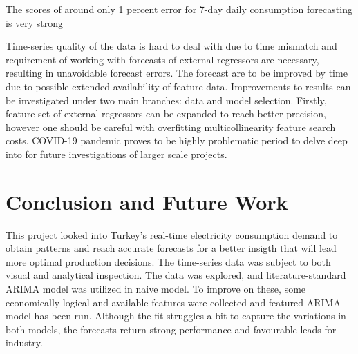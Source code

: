 \documentclass[11pt, a4paper, leqno]{article}
\begin{document}
The scores of around only 1 percent error for 7-day daily consumption forecasting is very strong

Time-series quality of the data is hard to deal with due to time mismatch and requirement of working with forecasts of external regressors are necessary, resulting in unavoidable forecast errors. The forecast are to be improved by time due to possible extended availability of feature data. Improvements to results can be investigated under two main branches: data and model selection. Firstly, feature set of external regressors can be expanded to reach better precision, however one should be careful with overfitting multicollinearity feature search costs. COVID-19 pandemic proves to be highly problematic period to delve deep into for future investigations of larger scale projects.

\section{Conclusion and Future Work}
\label{sec:ConcFut}


This project looked into Turkey's real-time electricity consumption demand to obtain patterns and reach accurate forecasts for a better insigth that will lead more optimal production decisions. The time-series data was subject to both visual and analytical inspection. The data was explored, and literature-standard ARIMA model was utilized in naive model. To improve on these, some economically logical and available features were collected and featured ARIMA model has been run. Although the fit struggles a bit to capture the variations in both models, the forecasts return strong performance and favourable leads for industry.


\printbibliography
{}




\end{document}
